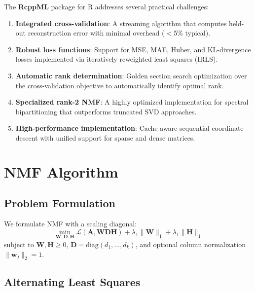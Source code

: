 \documentclass[11pt]{article}
\newcommand{\proglang}[1]{\textsf{#1}}
\newcommand{\pkg}[1]{\textbf{#1}}
\begin{document}
The \pkg{RcppML} package for \proglang{R} addresses several practical challenges:

\begin{enumerate}
  \item \textbf{Integrated cross-validation}: A streaming algorithm that 
  computes held-out reconstruction error with minimal overhead ($<$5\% typical).
  
  \item \textbf{Robust loss functions}: Support for MSE, MAE, Huber, and 
  KL-divergence losses implemented via iteratively reweighted least squares 
  (IRLS).
  
  \item \textbf{Automatic rank determination}: Golden section search 
  optimization over the cross-validation objective to automatically identify 
  optimal rank.
  
  \item \textbf{Specialized rank-2 NMF}: A highly optimized implementation for 
  spectral bipartitioning that outperforms truncated SVD approaches.
  
  \item \textbf{High-performance implementation}: Cache-aware sequential 
  coordinate descent with unified support for sparse and dense matrices.
\end{enumerate}


\section{NMF Algorithm}

\subsection{Problem Formulation}

We formulate NMF with a scaling diagonal:
\begin{equation}
  \min_{\mathbf{W}, \mathbf{D}, \mathbf{H}} 
  \mathcal{L}(\mathbf{A}, \mathbf{W}\mathbf{D}\mathbf{H}) + 
  \lambda_1 \|\mathbf{W}\|_1 + \lambda_1 \|\mathbf{H}\|_1
\end{equation}
subject to $\mathbf{W}, \mathbf{H} \geq 0$, $\mathbf{D} = \text{diag}(d_1, 
\ldots, d_k)$, and optional column normalization $\|\mathbf{w}_j\|_2 = 1$.

\subsection{Alternating Least Squares}
\end{document}
